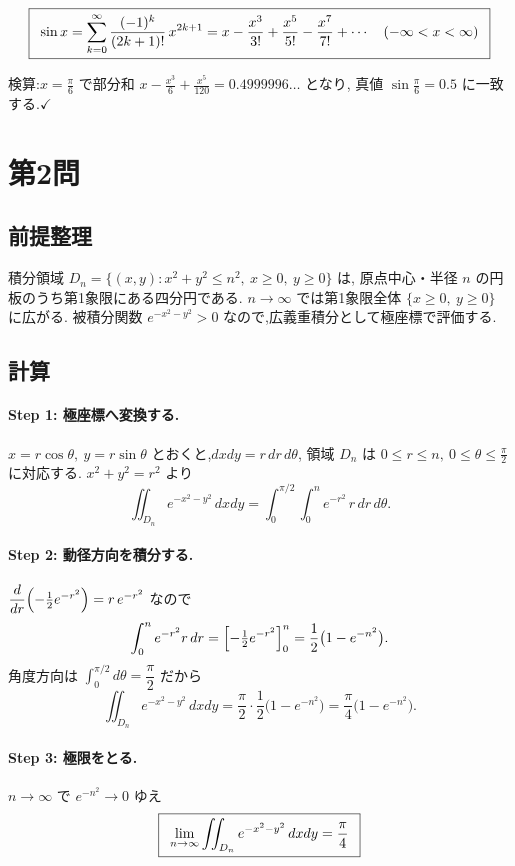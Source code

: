 \documentclass[11pt,a4paper]{article}
\begin{document}
\[
\boxed{\,\
\displaystyle\sin x=\sum_{k=0}^{\infty}\frac{(-1)^{k}}{(2k+1)!}\,x^{2k+1}
=x-\frac{x^{3}}{3!}+\frac{x^{5}}{5!}-\frac{x^{7}}{7!}+\cdots
\quad(-\infty<x<\infty)\ \,}
\]

検算:$x=\frac{\pi}{6}$ で部分和 $x-\frac{x^3}{6}+\frac{x^5}{120}=0.4999996\ldots$ となり,
真値 $\sin\frac{\pi}{6}=0.5$ に一致する.$\checkmark$

\section*{第2問}

\subsection*{前提整理}

積分領域 $D_n=\{(x,y):x^2+y^2\le n^2,\ x\ge0,\ y\ge0\}$ は,
原点中心・半径 $n$ の円板のうち第1象限にある四分円である.
$n\to\infty$ では第1象限全体 $\{x\ge0,\ y\ge0\}$ に広がる.
被積分関数 $e^{-x^2-y^2}>0$ なので,広義重積分として極座標で評価する.

\subsection*{計算}

\paragraph{Step 1: 極座標へ変換する.}
$x=r\cos\theta,\ y=r\sin\theta$ とおくと,$dxdy=r\,dr\,d\theta$,
領域 $D_n$ は $0\le r\le n,\ 0\le\theta\le\frac{\pi}{2}$ に対応する.
$x^2+y^2=r^2$ より
\[
\iint_{D_n}e^{-x^2-y^2}\,dxdy
=\int_{0}^{\pi/2}\!\!\int_{0}^{n}e^{-r^{2}}\,r\,dr\,d\theta.
\]

\paragraph{Step 2: 動径方向を積分する.}
$\dfrac{d}{dr}\Bigl(-\tfrac12 e^{-r^2}\Bigr)=r\,e^{-r^2}$ なので
\[
\int_{0}^{n}e^{-r^{2}}r\,dr
=\Bigl[-\tfrac12 e^{-r^{2}}\Bigr]_{0}^{n}
=\frac12\bigl(1-e^{-n^{2}}\bigr).
\]
角度方向は $\int_0^{\pi/2}d\theta=\dfrac{\pi}{2}$ だから
\[
\iint_{D_n}e^{-x^2-y^2}\,dxdy
=\frac{\pi}{2}\cdot\frac12\bigl(1-e^{-n^{2}}\bigr)
=\frac{\pi}{4}\bigl(1-e^{-n^{2}}\bigr).
\]

\paragraph{Step 3: 極限をとる.}
$n\to\infty$ で $e^{-n^2}\to0$ ゆえ
\[
\ans{\
\displaystyle\lim_{n\to\infty}\iint_{D_n}e^{-x^2-y^2}\,dxdy=\frac{\pi}{4}\ }
\]
\end{document}
